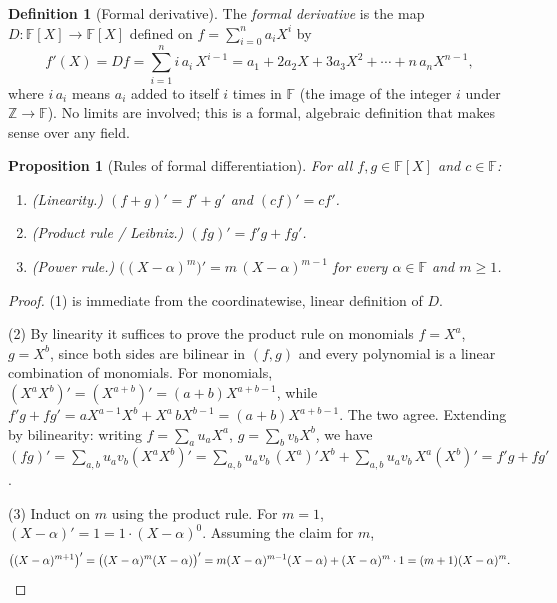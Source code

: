 \documentclass[11pt,a4paper]{article}
\newtheorem{proposition}[theorem]{Proposition}
\theoremstyle{definition}
\newtheorem{definition}[theorem]{Definition}
\theoremstyle{remark}
\newcommand{\Z}{\ensuremath{\mathbb{Z}}}
\newcommand{\F}{\ensuremath{\mathbb{F}}}
\begin{document}
\begin{definition}[Formal derivative]\label{polynomials:def:derivative}
The \emph{formal derivative} is the map \(D \colon \F[X] \to \F[X]\) defined on
\(f = \sum_{i=0}^n a_i X^i\) by
\[
  f'(X) = D f = \sum_{i=1}^{n} i\, a_i\, X^{i-1}
        = a_1 + 2 a_2 X + 3 a_3 X^2 + \cdots + n\, a_n X^{n-1},
\]
where \(i\, a_i\) means \(a_i\) added to itself \(i\) times in \(\F\) (the image
of the integer \(i\) under \(\Z \to \F\)). No limits are involved; this is a
formal, algebraic definition that makes sense over any field.
\end{definition}

\begin{proposition}[Rules of formal differentiation]\label{polynomials:prop:deriv-rules}
For all \(f, g \in \F[X]\) and \(c \in \F\):
\begin{enumerate}
  \item \emph{(Linearity.)} \((f + g)' = f' + g'\) and \((c f)' = c f'\).
  \item \emph{(Product rule / Leibniz.)} \((f g)' = f' g + f g'\).
  \item \emph{(Power rule.)} \(\bigl((X - \alpha)^m\bigr)' = m\,(X - \alpha)^{m-1}\)
        for every \(\alpha \in \F\) and \(m \ge 1\).
\end{enumerate}
\end{proposition}

\begin{proof}
(1) is immediate from the coordinatewise, linear definition of \(D\).

(2) By linearity it suffices to prove the product rule on monomials \(f = X^a\),
\(g = X^b\), since both sides are bilinear in \((f, g)\) and every polynomial is
a linear combination of monomials. For monomials, \((X^a X^b)' = (X^{a+b})' =
(a+b) X^{a+b-1}\), while \(f' g + f g' = a X^{a-1} X^b + X^a\, b X^{b-1} =
(a + b) X^{a+b-1}\). The two agree. Extending by bilinearity: writing
\(f = \sum_a u_a X^a\), \(g = \sum_b v_b X^b\), we have \((fg)' =
\sum_{a,b} u_a v_b (X^a X^b)' = \sum_{a,b} u_a v_b\,(X^a)'X^b +
\sum_{a,b} u_a v_b\, X^a (X^b)' = f' g + f g'\).

(3) Induct on \(m\) using the product rule. For \(m = 1\),
\((X - \alpha)' = 1 = 1\cdot(X-\alpha)^0\). Assuming the claim for \(m\),
\[
  \bigl((X-\alpha)^{m+1}\bigr)' = \bigl((X-\alpha)^m (X - \alpha)\bigr)'
   = m(X-\alpha)^{m-1}(X-\alpha) + (X-\alpha)^m \cdot 1
   = (m+1)(X-\alpha)^m. \qedhere
\]
\end{proof}
\end{document}
